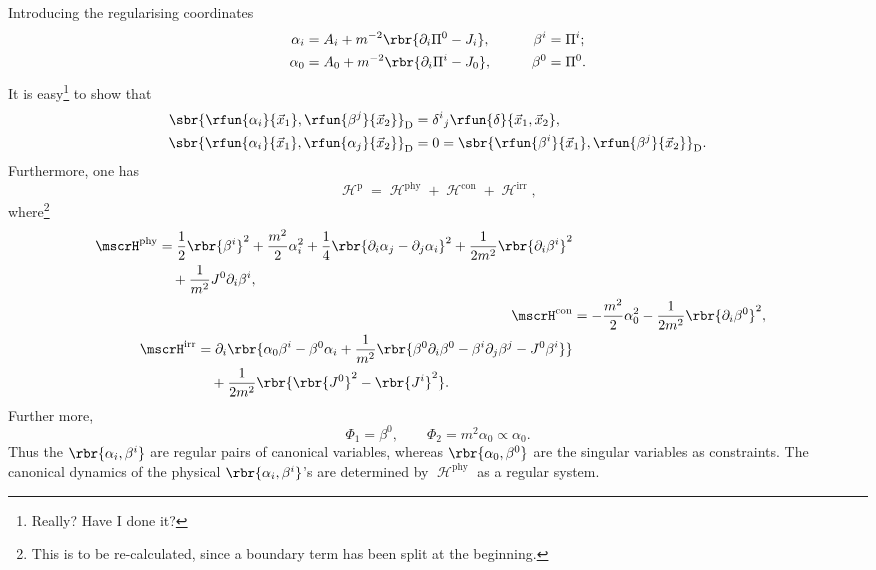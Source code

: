 \documentclass[a4paper,11pt]{article}
\begin{document}
Introducing the regularising coordinates
\begin{alignat}{3}
\alpha_i &= A_i + m^{-2}\rbr{\partial_i \Pi^0 - J_i},&\qquad \beta^i &= \Pi^i; 
\\
\alpha_0 &= A_0 + m^{-2}\rbr{\partial_i \Pi^i - J_0},&\qquad \beta^0 &= \Pi^0.
\end{alignat}
It is easy\footnote{Really? Have I done it?} to show that
\begin{align}
\sbr{\rfun{\alpha_i}{\vec{x}_1},\rfun{\beta^j}{\vec{x}_2}}_\text{D} &= 
\delta^i{}_j\rfun{\delta}{\vec{x}_1,\vec{x}_2},\\
\sbr{\rfun{\alpha_i}{\vec{x}_1},\rfun{\alpha_j}{\vec{x}_2}}_\text{D} &= 0 =
\sbr{\rfun{\beta^i}{\vec{x}_1},\rfun{\beta^j}{\vec{x}_2}}_\text{D}.
\end{align}
Furthermore, one has
\begin{equation}
\mscrH^\text{p} = \mscrH^\text{phy}+\mscrH^\text{con}+\mscrH^\text{irr},
\end{equation}
where\footnote{This is to be re-calculated, since a boundary term has been 
split at the beginning.}
\begin{align}
\begin{split}
\mscrH^\text{phy} &= \frac{1}{2}\rbr{\beta^i}^2 + \frac{m^2}{2}\alpha_i^2 +
\frac{1}{4}\rbr{\partial_i \alpha_j - \partial_j \alpha_i}^2 + 
\frac{1}{2m^2}\rbr{\partial_i \beta^i}^2 \\
&\quad +\frac{1}{m^2} J^0 \partial_i \beta^i,
\end{split}\\
\mscrH^\text{con} &= -\frac{m^2}{2}\alpha_0^2 - \frac{1}{2m^2} 
\rbr{\partial_i \beta^0}^2,\\
\begin{split}
\mscrH^\text{irr} &= \partial_i\rbr{\alpha_0\beta^i - \beta^0\alpha_i + 
\frac{1}{m^2}\rbr{\beta^0\partial_i\beta^0 - 
\beta^i\partial_j\beta^j - J^0 \beta^i}} \\
&\quad + \frac{1}{2m^2}\rbr{\rbr{J^0}^2 - \rbr{J^i}^2}.
\end{split}
\end{align}
Further more,
\begin{equation}
\Phi_1 = \beta^0,\qquad\Phi_2 = m^2\alpha_0 \propto \alpha_0.
\end{equation}
Thus the $\rbr{\alpha_i, \beta^i}$ are regular pairs of canonical variables, 
whereas $\rbr{\alpha_0, \beta^0}$ are the singular variables as constraints. 
The canonical dynamics of the physical $\rbr{\alpha_i, \beta^i}$'s are 
determined by $\mscrH^\text{phy}$ as a regular system.
\end{document}
